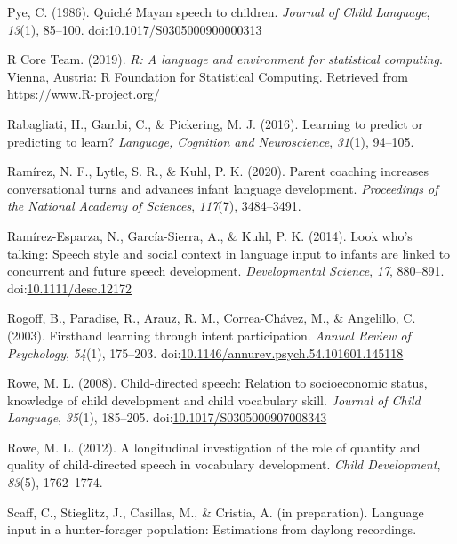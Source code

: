\documentclass[,man,floatsintext]{apa6}
\begin{document}
\hypertarget{ref-pye1986quiche}{}
Pye, C. (1986). Quiché Mayan speech to children. \emph{Journal of Child
Language}, \emph{13}(1), 85--100.
doi:\href{https://doi.org/10.1017/S0305000900000313}{10.1017/S0305000900000313}

\hypertarget{ref-R-base}{}
R Core Team. (2019). \emph{R: A language and environment for statistical
computing}. Vienna, Austria: R Foundation for Statistical Computing.
Retrieved from \url{https://www.R-project.org/}

\hypertarget{ref-rabagliati2016learning}{}
Rabagliati, H., Gambi, C., \& Pickering, M. J. (2016). Learning to
predict or predicting to learn? \emph{Language, Cognition and
Neuroscience}, \emph{31}(1), 94--105.

\hypertarget{ref-ramirez2020parent}{}
Ramírez, N. F., Lytle, S. R., \& Kuhl, P. K. (2020). Parent coaching
increases conversational turns and advances infant language development.
\emph{Proceedings of the National Academy of Sciences}, \emph{117}(7),
3484--3491.

\hypertarget{ref-ramirezesparza2014look}{}
Ramírez-Esparza, N., García-Sierra, A., \& Kuhl, P. K. (2014). Look
who's talking: Speech style and social context in language input to
infants are linked to concurrent and future speech development.
\emph{Developmental Science}, \emph{17}, 880--891.
doi:\href{https://doi.org/10.1111/desc.12172}{10.1111/desc.12172}

\hypertarget{ref-rogoff2003firsthand}{}
Rogoff, B., Paradise, R., Arauz, R. M., Correa-Chávez, M., \& Angelillo,
C. (2003). Firsthand learning through intent participation. \emph{Annual
Review of Psychology}, \emph{54}(1), 175--203.
doi:\href{https://doi.org/10.1146/annurev.psych.54.101601.145118}{10.1146/annurev.psych.54.101601.145118}

\hypertarget{ref-rowe2008child}{}
Rowe, M. L. (2008). Child-directed speech: Relation to socioeconomic
status, knowledge of child development and child vocabulary skill.
\emph{Journal of Child Language}, \emph{35}(1), 185--205.
doi:\href{https://doi.org/10.1017/S0305000907008343}{10.1017/S0305000907008343}

\hypertarget{ref-rowe2012longitudinal}{}
Rowe, M. L. (2012). A longitudinal investigation of the role of quantity
and quality of child-directed speech in vocabulary development.
\emph{Child Development}, \emph{83}(5), 1762--1774.

\hypertarget{ref-scaffIPlanguage}{}
Scaff, C., Stieglitz, J., Casillas, M., \& Cristia, A. (in preparation).
Language input in a hunter-forager population: Estimations from daylong
recordings.
\end{document}
